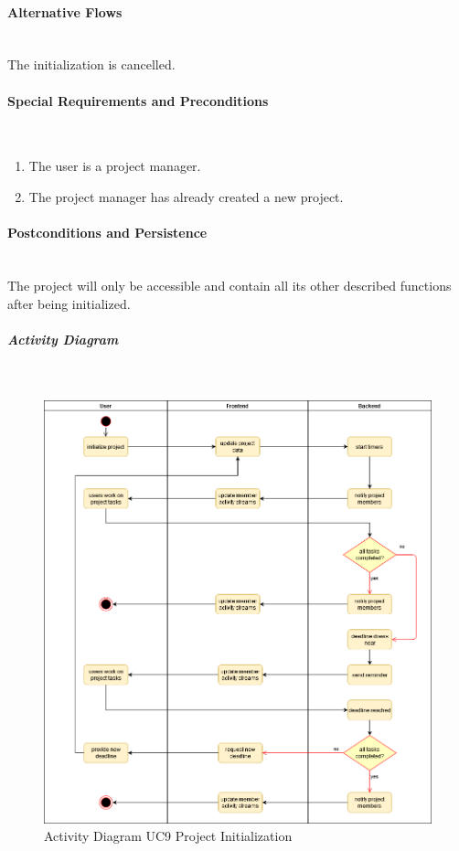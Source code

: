 \paragraph*{Alternative Flows}\mbox{}\\
The initialization is cancelled.

\paragraph*{Special Requirements and Preconditions}\mbox{}\\
\begin{enumerate}
	\vspace{-3mm}
	\setlength\itemsep{-1em}
	\item The user is a project manager.
	\item The project manager has already created a new project.
\end{enumerate}

\paragraph*{Postconditions and Persistence}\mbox{}\\
The project will only be accessible and contain all its other described functions after being initialized.

\newpage
\subparagraph{Activity Diagram}\mbox{}\\
\begin{figure}[H]
	\centering
	\includegraphics[width=1.0\textwidth]{Content/Domain/UC9Initialization.png}
	\caption{Activity Diagram  \ac{UC}9 Project Initialization}
	\label{fig:label14}
\end{figure}


